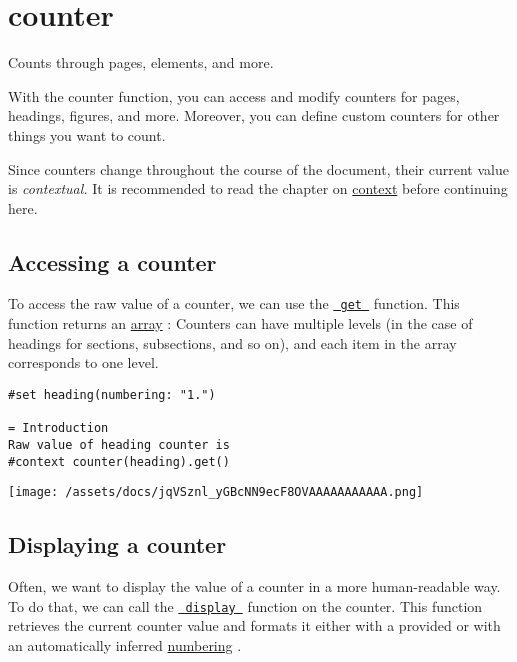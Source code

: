 \section{\texorpdfstring{{ counter }}{ counter }}\label{summary}

Counts through pages, elements, and more.

With the counter function, you can access and modify counters for pages,
headings, figures, and more. Moreover, you can define custom counters
for other things you want to count.

Since counters change throughout the course of the document, their
current value is \emph{contextual.} It is recommended to read the
chapter on \href{/docs/reference/context/}{context} before continuing
here.

\subsection{Accessing a counter}\label{accessing}

To access the raw value of a counter, we can use the
\href{/docs/reference/introspection/counter/\#definitions-get}{\texttt{\ get\ }}
function. This function returns an
\href{/docs/reference/foundations/array/}{array} : Counters can have
multiple levels (in the case of headings for sections, subsections, and
so on), and each item in the array corresponds to one level.

\begin{verbatim}
#set heading(numbering: "1.")

= Introduction
Raw value of heading counter is
#context counter(heading).get()
\end{verbatim}

\texttt{[image: /assets/docs/jqVSznl\_yGBcNN9ecF8OVAAAAAAAAAAA.png]}

\subsection{Displaying a counter}\label{displaying}

Often, we want to display the value of a counter in a more
human-readable way. To do that, we can call the
\href{/docs/reference/introspection/counter/\#definitions-display}{\texttt{\ display\ }}
function on the counter. This function retrieves the current counter
value and formats it either with a provided or with an automatically
inferred \href{/docs/reference/model/numbering/}{numbering} .

